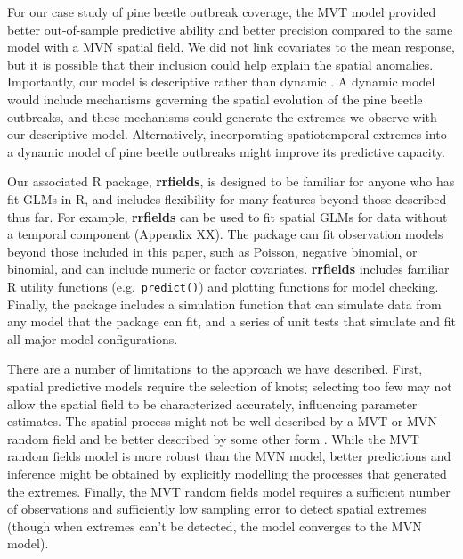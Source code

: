\documentclass[12pt,english]{article}
\begin{document}
\begin{spacing}{1.9}
For our case study of pine beetle outbreak coverage, the MVT model provided
better out-of-sample predictive ability and better precision compared to the same model
with a MVN spatial field. We did not link covariates to the mean response, but it is
possible that their inclusion could help explain the spatial anomalies. Importantly,
our model is descriptive rather than dynamic \citep{cressie2011}.
A dynamic model would include mechanisms governing the spatial evolution of the
pine beetle outbreaks, and these mechanisms could generate the extremes we
observe with our descriptive model. Alternatively, incorporating spatiotemporal
extremes into a dynamic model of pine beetle outbreaks might improve its
predictive capacity.

Our associated R package, \textbf{rrfields}, is designed to be familiar for
anyone who has fit GLMs in R, and includes flexibility for many features beyond
those described thus far. For example, \textbf{rrfields} can be used to fit
spatial GLMs for data without a temporal component (Appendix XX). The package
can fit observation models beyond those included in this paper, such as Poisson,
negative binomial, or binomial, and can include numeric or factor covariates.
\textbf{rrfields} includes familiar R utility functions (e.g.\
\texttt{predict()}) and plotting functions for model checking. Finally, the
package includes a simulation function that can simulate data from any model
that the package can fit, and a series of unit tests that simulate and fit all
major model configurations.

There are a number of limitations to the approach we have described. First,
spatial predictive models require the selection of knots; selecting too few may
not allow the spatial field to be characterized accurately, influencing parameter
estimates. The spatial process might not be well described by a
MVT or MVN random field and be better described by some other form
\citep[e.g.][]{conn2015}. While the MVT random fields model is
more robust than the MVN model, better
predictions and inference might be obtained by explicitly modelling the
processes that generated the extremes. Finally, the MVT random
fields model requires a sufficient number of observations and sufficiently low
sampling error to detect spatial extremes (though when extremes can't be detected,
the model converges to the MVN model).


\end{spacing}
\end{document}
